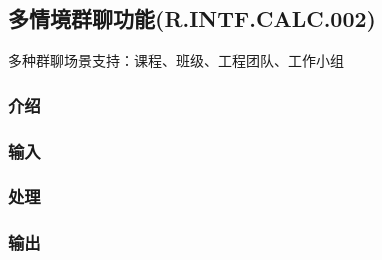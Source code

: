 \subsection{多情境群聊功能(R.INTF.CALC.002)}
多种群聊场景支持：课程、班级、工程团队、工作小组
\subsubsection{介绍}
\subsubsection{输入}
\subsubsection{处理}
\subsubsection{输出}